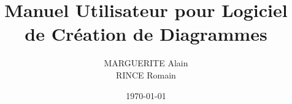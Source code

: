 \documentclass[12pt,a4paper,utf8x,titlepage]{report}
\title{Manuel Utilisateur pour Logiciel de Création de Diagrammes}
\author{MARGUERITE Alain\\ RINCE Romain}
\date{\today}
\begin{document}
\makeglossaries

\maketitle




\clearpage

\tableofcontents

\clearpage











\printglossary

\listoffigures
\printindex



\appendix
%


\end{document}
